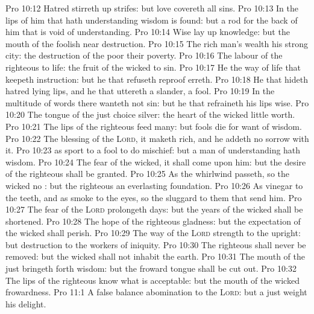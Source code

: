\vs Pro 10:12 Hatred stirreth up strifes: but love covereth all sins.
\vs Pro 10:13 In the lips of him that hath understanding wisdom is found: but a rod  for the back of him that is void of understanding.
\vs Pro 10:14 Wise  lay up knowledge: but the mouth of the foolish  near destruction.
\vs Pro 10:15 The rich man's wealth  his strong city: the destruction of the poor  their poverty.
\vs Pro 10:16 The labour of the righteous  to life: the fruit of the wicked to sin.
\vs Pro 10:17 He  the way of life that keepeth instruction: but he that refuseth reproof erreth.
\vs Pro 10:18 He that hideth hatred  lying lips, and he that uttereth a slander,  a fool.
\vs Pro 10:19 In the multitude of words there wanteth not sin: but he that refraineth his lips  wise.
\vs Pro 10:20 The tongue of the just  choice silver: the heart of the wicked  little worth.
\vs Pro 10:21 The lips of the righteous feed many: but fools die for want of wisdom.
\vs Pro 10:22 The blessing of the \textsc{Lord}, it maketh rich, and he addeth no sorrow with it.
\vs Pro 10:23  as sport to a fool to do mischief: but a man of understanding hath wisdom.
\vs Pro 10:24 The fear of the wicked, it shall come upon him: but the desire of the righteous shall be granted.
\vs Pro 10:25 As the whirlwind passeth, so  the wicked no : but the righteous  an everlasting foundation.
\vs Pro 10:26 As vinegar to the teeth, and as smoke to the eyes, so  the sluggard to them that send him.
\vs Pro 10:27 The fear of the \textsc{Lord} prolongeth days: but the years of the wicked shall be shortened.
\vs Pro 10:28 The hope of the righteous  gladness: but the expectation of the wicked shall perish.
\vs Pro 10:29 The way of the \textsc{Lord}  strength to the upright: but destruction  to the workers of iniquity.
\vs Pro 10:30 The righteous shall never be removed: but the wicked shall not inhabit the earth.
\vs Pro 10:31 The mouth of the just bringeth forth wisdom: but the froward tongue shall be cut out.
\vs Pro 10:32 The lips of the righteous know what is acceptable: but the mouth of the wicked  frowardness.
\vs Pro 11:1 A false balance  abomination to the \textsc{Lord}: but a just weight  his delight.
